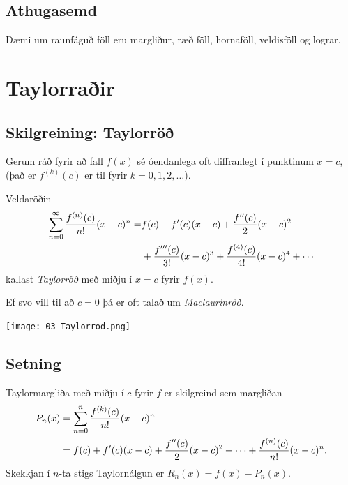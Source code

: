 \documentclass[a4paper,10pt,icelandic]{sphinxmanual}
\begin{document}
\subsection{Athugasemd}
\label{kafli10:athugasemd}
Dæmi um raunfáguð föll eru margliður, ræð föll, hornaföll, veldisföll og
lograr.


\section{Taylorraðir}
\label{kafli10:taylorrair}\label{kafli10:index-6}

\subsection{Skilgreining: Taylorröð}
\label{kafli10:skilgreining-taylorro}
Gerum ráð fyrir að fall \(f(x)\) sé óendanlega oft diffranlegt í
punktinum \(x=c\), (það er \(f^{(k)}(c)\) er til fyrir
\(k=0, 1, 2, \ldots\)).

Veldaröðin
\begin{gather}
\begin{split}\begin{aligned}
\sum_{n=0}^\infty \frac{f^{(n)}(c)}{n!}(x-c)^n = & f(c)+f'(c)(x-c)+
\frac{f''(c)}{2}(x-c)^2 \\ & + \frac{f'''(c)}{3!}(x-c)^3
+ \frac{f^{(4)}(c)}{4!}(x-c)^4 + \cdots \end{aligned}\end{split}\notag
\end{gather}
kallast \emph{Taylorröð} með miðju í \(x=c\) fyrir \(f(x)\).

Ef svo vill til að \(c=0\) þá er oft talað um \emph{Maclaurinröð}.


\begin{center}
\texttt{[image: 03\_Taylorrod.png]}
\end{center}



\subsection{Setning}
\label{kafli10:id4}
Taylormargliða með miðju í \(c\) fyrir \(f\) er skilgreind sem
margliðan
\begin{gather}
\begin{split}\begin{aligned}
  P_n(x)& =\sum_{n=0}^n \frac{f^{(k)}(c)}{n!}(x-c)^n \\
  &=f(c)+f'(c)(x-c)+ \frac{f''(c)}{2}(x-c)^2+\cdots+\frac{f^{(n)}(c)}{n!}(x-c)^n.\end{aligned}\end{split}\notag
\end{gather}
Skekkjan í \(n\)-ta stigs Taylornálgun er
\(R_n(x)=f(x)-P_n(x)\).
\end{document}
